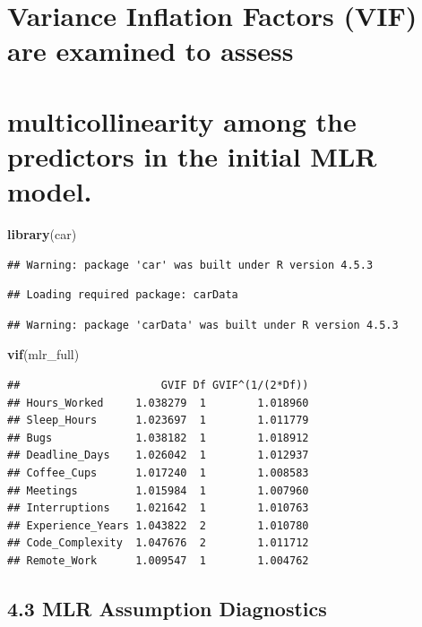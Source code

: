 \documentclass[
]{article}
\newenvironment{Shaded}{\begin{snugshade}}{\end{snugshade}}
\newcommand{\FunctionTok}[1]{\textcolor[rgb]{0.13,0.29,0.53}{\textbf{#1}}}
\newcommand{\NormalTok}[1]{#1}
\begin{document}
\section{Variance Inflation Factors (VIF) are examined to
assess}\label{variance-inflation-factors-vif-are-examined-to-assess}

\section{multicollinearity among the predictors in the initial MLR
model.}\label{multicollinearity-among-the-predictors-in-the-initial-mlr-model.}

\begin{Shaded}
\begin{Highlighting}[]
\FunctionTok{library}\NormalTok{(car)}
\end{Highlighting}
\end{Shaded}

\begin{verbatim}
## Warning: package 'car' was built under R version 4.5.3
\end{verbatim}

\begin{verbatim}
## Loading required package: carData
\end{verbatim}

\begin{verbatim}
## Warning: package 'carData' was built under R version 4.5.3
\end{verbatim}

\begin{Shaded}
\begin{Highlighting}[]
\FunctionTok{vif}\NormalTok{(mlr\_full)}
\end{Highlighting}
\end{Shaded}

\begin{verbatim}
##                      GVIF Df GVIF^(1/(2*Df))
## Hours_Worked     1.038279  1        1.018960
## Sleep_Hours      1.023697  1        1.011779
## Bugs             1.038182  1        1.018912
## Deadline_Days    1.026042  1        1.012937
## Coffee_Cups      1.017240  1        1.008583
## Meetings         1.015984  1        1.007960
## Interruptions    1.021642  1        1.010763
## Experience_Years 1.043822  2        1.010780
## Code_Complexity  1.047676  2        1.011712
## Remote_Work      1.009547  1        1.004762
\end{verbatim}

\subsection{4.3 MLR Assumption
Diagnostics}\label{mlr-assumption-diagnostics}
\end{document}

